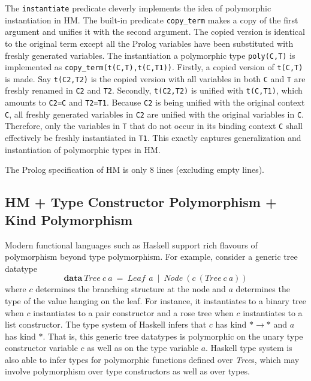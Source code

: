 \documentclass[runningheads,a4paper]{llncs}
\begin{document}
The \verb|instantiate| predicate
cleverly implements the idea of polymorphic instantiation in HM.
The built-in predicate \verb|copy_term| makes a copy of the first argument
and unifies it with the second argument. The copied version is identical to
the original term except all the Prolog variables have been substituted with
freshly generated variables. The instantiation a polymorphic type
\verb|poly(C,T)| is implemented as \verb|copy_term(t(C,T),t(C,T1))|.
Firstly, a copied version of \verb|t(C,T)| is made. Say \verb|t(C2,T2)|
is the copied version with all variables in both \verb|C| and \verb|T|
are freshly renamed in \verb|C2| and \verb|T2|. Secondly, \verb|t(C2,T2)|
is unified with \verb|t(C,T1)|, which amounts to \verb|C2=C| and
\verb|T2=T1|. Because \verb|C2| is being unified with the original
context \verb|C|, all freshly generated variables in \verb|C2| are
unified with the original variables in \verb|C|. Therefore, only
the variables in \verb|T| that do not occur in its binding context
\verb|C| shall effectively be freshly instantiated in \verb|T1|.
This exactly captures generalization and instantiation of
polymorphic types in HM.

The Prolog specification of HM is only 8 lines (excluding empty lines).

\subsection{HM + Type Constructor Polymorphism + Kind Polymorphism}
\label{ssec:HMtck}
Modern functional languages such as Haskell support rich flavours of
polymorphism beyond type polymorphism. For example, consider
a generic tree datatype
\[ \textbf{data}~\textit{Tree}~c~a
  ~=~ \textit{Leaf}\,~a ~\mid~ \textit{Node}~(c~(\textit{Tree}~c~a)) \]
where $c$ determines the branching structure at the node and $a$
determines the type of the value hanging on the leaf. For instance,
it instantiates to a binary tree when $c$ instantiates to a pair constructor
and a rose tree when $c$ instantiates to a list constructor.
The type system of Haskell infers that $c$ has kind $*\to*$ and
$a$ has kind $*$. That is, this generic tree datatypes is polymorphic on
the unary type constructor variable $c$ as well as on the type variable $a$.
Haskell type system is also able to infer types for polymorphic functions defined
over \textit{Tree}s, which may involve polymorphism over type constructors
as well as over types.
\end{document}
